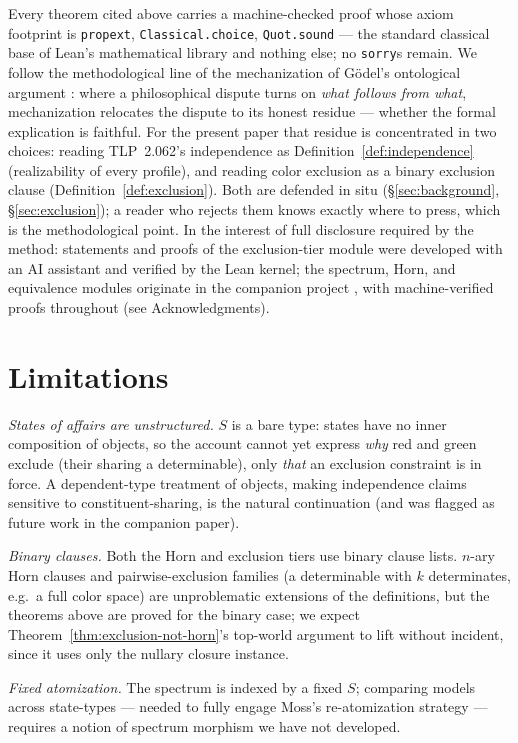 \documentclass[10pt, letterpaper]{article}
\theoremstyle{remark}
\newcommand{\lean}[1]{\texttt{#1}}
\newcommand{\TLP}[1]{TLP~#1}
\begin{document}
Every theorem cited above carries a machine-checked proof whose axiom
footprint is \lean{propext}, \lean{Classical.choice}, \lean{Quot.sound} ---
the standard classical base of Lean's mathematical library and nothing else;
no \lean{sorry}s remain. We follow the methodological line of the
mechanization of G\"odel's ontological argument \cite{benzmuller2014}: where
a philosophical dispute turns on \emph{what follows from what}, mechanization
relocates the dispute to its honest residue --- whether the formal
explication is faithful. For the present paper that residue is concentrated
in two choices: reading \TLP{2.062}'s independence as
Definition~\ref{def:independence} (realizability of every profile), and
reading color exclusion as a binary exclusion clause
(Definition~\ref{def:exclusion}). Both are defended in situ
(\S\ref{sec:background}, \S\ref{sec:exclusion}); a reader who rejects them
knows exactly where to press, which is the methodological point. In the
interest of full disclosure required by the method: statements and proofs of
the exclusion-tier module were developed with an AI assistant and verified by
the Lean kernel; the spectrum, Horn, and equivalence modules originate in the
companion project \cite{companion2026}, with machine-verified proofs
throughout (see Acknowledgments).

\section{Limitations}\label{sec:limitations}

\emph{States of affairs are unstructured.} $S$ is a bare type: states have
no inner composition of objects, so the account cannot yet express
\emph{why} red and green exclude (their sharing a determinable), only
\emph{that} an exclusion constraint is in force. A dependent-type treatment
of objects, making independence claims sensitive to constituent-sharing, is
the natural continuation (and was flagged as future work in the companion
paper).

\emph{Binary clauses.} Both the Horn and exclusion tiers use binary clause
lists. $n$-ary Horn clauses and pairwise-exclusion families (a determinable
with $k$ determinates, e.g.\ a full color space) are unproblematic
extensions of the definitions, but the theorems above are proved for the
binary case; we expect Theorem~\ref{thm:exclusion-not-horn}'s top-world
argument to lift without incident, since it uses only the nullary closure
instance.

\emph{Fixed atomization.} The spectrum is indexed by a fixed $S$; comparing
models across state-types --- needed to fully engage Moss's re-atomization
strategy --- requires a notion of spectrum morphism we have not developed.
\end{document}

